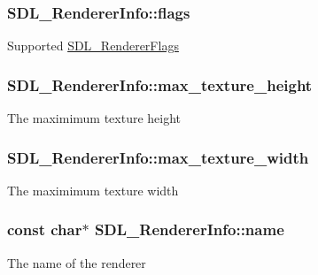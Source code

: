 \subsubsection[{flags}]{ S\+D\+L\+\_\+\+Renderer\+Info\+::flags}\label{structSDL__RendererInfo_a95cf0ffd1704fd0a4dd8ceac6c9f0542}
Supported \hyperlink{SDL__render_8h_a3a6e51bbee5fd3f8ee0c9f7504ae4130}{S\+D\+L\+\_\+\+Renderer\+Flags} \hypertarget{structSDL__RendererInfo_a87c6a13e8d535c2148f8913c05e13102}{}
\subsubsection[{max\+\_\+texture\+\_\+height}]{ S\+D\+L\+\_\+\+Renderer\+Info\+::max\+\_\+texture\+\_\+height}\label{structSDL__RendererInfo_a87c6a13e8d535c2148f8913c05e13102}
The maximimum texture height \hypertarget{structSDL__RendererInfo_a6e6757e3d5c1f0922adaba39380edfa6}{}
\subsubsection[{max\+\_\+texture\+\_\+width}]{ S\+D\+L\+\_\+\+Renderer\+Info\+::max\+\_\+texture\+\_\+width}\label{structSDL__RendererInfo_a6e6757e3d5c1f0922adaba39380edfa6}
The maximimum texture width \hypertarget{structSDL__RendererInfo_a433ecb2865c81ba9f28038e56a4ae6f3}{}
\subsubsection[{name}]{\setlength{\rightskip}{0pt plus 5cm}const char$\ast$ S\+D\+L\+\_\+\+Renderer\+Info\+::name}\label{structSDL__RendererInfo_a433ecb2865c81ba9f28038e56a4ae6f3}
The name of the renderer \hypertarget{structSDL__RendererInfo_acdec165b2053b914313f5996983ec6b8}{}
